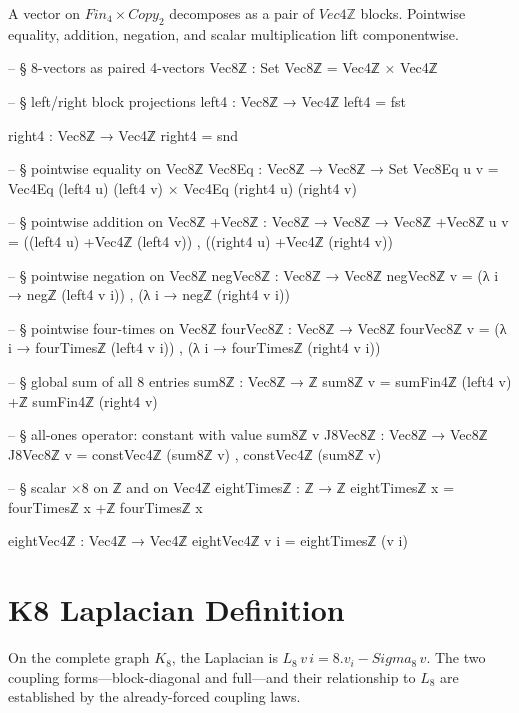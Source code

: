\documentclass[11pt,a4paper]{book}
\def\Sigma{Sigma}%
\def\cdot{.}%
\def\texttt#1{#1}%
\def\text#1{#1}%
\def\texorpdfstring#1#2{#2}%
\begin{document}
A vector on $\text{Fin}_4 \times \text{Copy}_2$ decomposes as a pair of
$\texttt{Vec4ℤ}$ blocks.  Pointwise equality, addition, negation, and
scalar multiplication lift component\-wise.

\begin{code}
-- § 8-vectors as paired 4-vectors
Vec8ℤ : Set
Vec8ℤ = Vec4ℤ × Vec4ℤ

-- § left/right block projections
left4 : Vec8ℤ → Vec4ℤ
left4 = fst

right4 : Vec8ℤ → Vec4ℤ
right4 = snd

-- § pointwise equality on Vec8ℤ
Vec8Eq : Vec8ℤ → Vec8ℤ → Set
Vec8Eq u v = Vec4Eq (left4 u) (left4 v) × Vec4Eq (right4 u) (right4 v)

-- § pointwise addition on Vec8ℤ
+Vec8ℤ : Vec8ℤ → Vec8ℤ → Vec8ℤ
+Vec8ℤ u v = ((left4 u) +Vec4ℤ (left4 v)) , ((right4 u) +Vec4ℤ (right4 v))

-- § pointwise negation on Vec8ℤ
negVec8ℤ : Vec8ℤ → Vec8ℤ
negVec8ℤ v = (λ i → negℤ (left4 v i)) , (λ i → negℤ (right4 v i))

-- § pointwise four-times on Vec8ℤ
fourVec8ℤ : Vec8ℤ → Vec8ℤ
fourVec8ℤ v = (λ i → fourTimesℤ (left4 v i)) , (λ i → fourTimesℤ (right4 v i))

-- § global sum of all 8 entries
sum8ℤ : Vec8ℤ → ℤ
sum8ℤ v = sumFin4ℤ (left4 v) +ℤ sumFin4ℤ (right4 v)

-- § all-ones operator: constant with value sum8ℤ v
J8Vec8ℤ : Vec8ℤ → Vec8ℤ
J8Vec8ℤ v = constVec4ℤ (sum8ℤ v) , constVec4ℤ (sum8ℤ v)

-- § scalar ×8 on ℤ and on Vec4ℤ
eightTimesℤ : ℤ → ℤ
eightTimesℤ x = fourTimesℤ x +ℤ fourTimesℤ x

eightVec4ℤ : Vec4ℤ → Vec4ℤ
eightVec4ℤ v i = eightTimesℤ (v i)
\end{code}

\section{K\texorpdfstring{$_8$}{8} Laplacian Definition}

On the complete graph $K_8$, the Laplacian is $L_8\,v\,i = 8 \cdot v_i - \Sigma_8\,v$.
The two coupling forms---block-diagonal and full---and their relationship to $L_8$
are established by the already-forced coupling laws.
\end{document}
